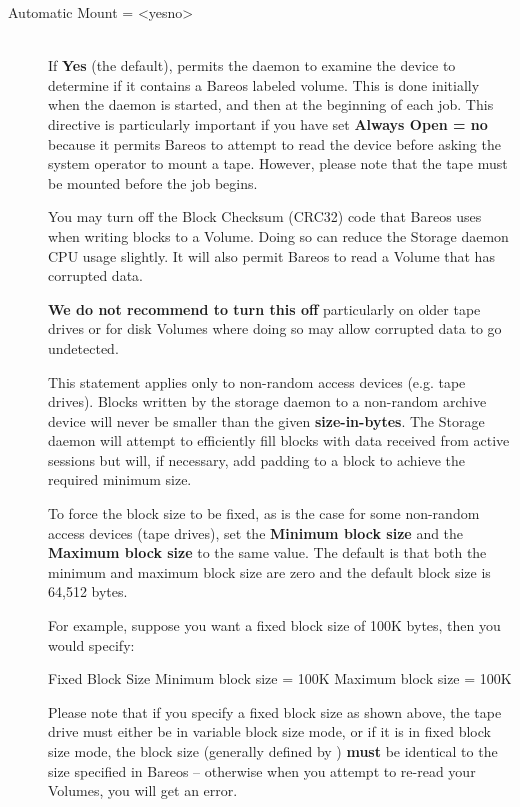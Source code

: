 \begin{description}
\item [Automatic Mount = {\textless}yes{\textbar}no{\textgreater}] \hfill \\
If {\bf Yes} (the default), permits the daemon to examine the device to
determine if it contains a Bareos labeled volume.  This is done
initially when the daemon is started, and then at the beginning of each
job.  This directive is particularly important if you have set
{\bf Always Open = no} because it permits Bareos to attempt to read the
device before asking the system operator to mount a tape.  However,
please note that the tape must be mounted before the job begins.


You may turn off the Block Checksum (CRC32) code that Bareos uses when
writing blocks to a Volume. Doing so can reduce the Storage daemon CPU usage
slightly.  It will also permit Bareos to read a Volume that has corrupted
data.

\textbf{We do not recommend to turn this off} particularly on older tape
drives or for disk Volumes where doing so may allow corrupted data to go
undetected.

%
This statement applies only to non-random access devices (e.g.
tape drives).  Blocks written by the storage daemon to a non-random
archive device will never be smaller than the given {\bf size-in-bytes}.
The Storage daemon will attempt to efficiently fill blocks with data
received from active sessions but will, if necessary, add padding to a
block to achieve the required minimum size.

To force the block size to be fixed, as is the case for some non-random
access devices (tape drives), set the {\bf Minimum block size} and the
{\bf Maximum block size} to the same value.  The default
is that both the minimum and maximum block size are zero and the default
block size is 64,512 bytes.

For  example, suppose you want a fixed block size of 100K bytes, then you
would specify:

\begin{bconfig}{Fixed Block Size}
Minimum block size = 100K
Maximum block size = 100K
\end{bconfig}

Please note that if you specify a fixed block size as shown above,  the tape
drive must either be in variable block size mode, or  if it is in fixed block
size mode, the block size (generally  defined by ) {\bf must} be
identical to the size specified  in Bareos -- otherwise when you attempt to
re-read your Volumes,  you will get an error.


\end{description}
